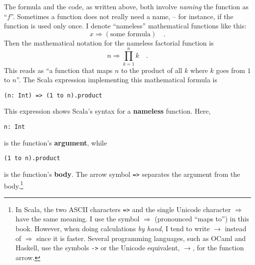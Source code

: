 The formula and the code, as written above, both involve \emph{naming}
the function as ``$f$''. Sometimes a function does not really need
a name, – for instance, if the function is used only once. I denote
``nameless'' mathematical functions like this: 
\[
x\Rightarrow\left(\text{some formula}\right)\quad.
\]
Then the mathematical notation for the nameless factorial function
is
\[
n\Rightarrow\prod_{k=1}^{n}k\quad.
\]
This reads as ``a function that maps $n$ to the product of all $k$
where $k$ goes from $1$ to $n$''. The Scala expression implementing
this mathematical formula is
\begin{lstlisting}
(n: Int) => (1 to n).product
\end{lstlisting}
This expression shows Scala's syntax for a \textbf{nameless}
function. Here, 
\begin{lstlisting}
n: Int
\end{lstlisting}
is the function's \textbf{argument}, while
\begin{lstlisting}
(1 to n).product
\end{lstlisting}
is the function's \textbf{body}. The arrow symbol \lstinline!=>!
separates the argument from the body.\footnote{In Scala, the two ASCII characters \lstinline!=>!
and the single Unicode character $\Rightarrow$ have the same meaning.
I use the symbol $\Rightarrow$ (pronounced ``maps to'') in this
book. However, when doing calculations \emph{by hand}, I tend to write
$\rightarrow$ instead of $\Rightarrow$ since it is faster. Several
programming languages, such as OCaml and Haskell, use the symbols
\lstinline!->! or the Unicode
equivalent, $\rightarrow$, for the function arrow.} 

